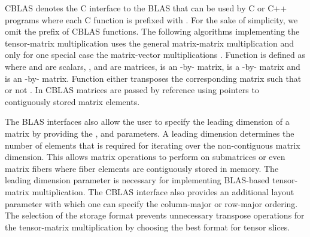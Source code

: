 CBLAS denotes the C interface to the BLAS that can be used by C or C++ programs where each C function is prefixed with .
For the sake of simplicity, we omit the  prefix of CBLAS functions.
The following algorithms implementing the tensor-matrix multiplication uses the general matrix-matrix multiplication  and only for one special case the matrix-vector multiplications .
Function  is defined as  where 
 and  are scalars, 
,  and  are matrices,
 is an -by- matrix, 
 is a -by- matrix and 
 is an -by- matrix.
Function  either transposes the corresponding matrix  such that  or not .
In CBLAS matrices are passed by reference using pointers to contiguously stored matrix elements.

The BLAS interfaces also allow the user to specify the leading dimension of a matrix by providing the ,  and  parameters.
A leading dimension determines the number of elements that is required for iterating over the non-contiguous matrix dimension.
This allows matrix operations to perform on submatrices or even matrix fibers where fiber elements are contiguously stored in memory.
The leading dimension parameter is necessary for implementing BLAS-based tensor-matrix multiplication.
The CBLAS interface also provides an additional layout parameter  with which one can specify the column-major or row-major ordering.
The selection of the storage format prevents unnecessary transpose operations for the tensor-matrix multiplication by choosing the best format for tensor slices.

